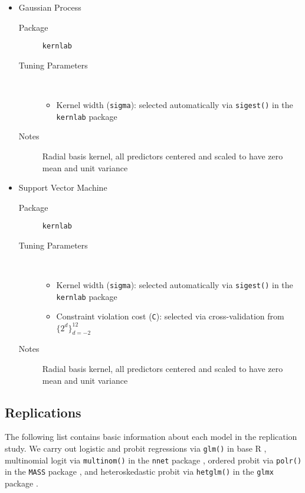 \begin{itemize}
  \item Gaussian Process
  \begin{description}
    \item[Package] \texttt{kernlab} \citep{pkg-kernlab}
    \item[Tuning Parameters] ~
    \begin{itemize}
      \item Kernel width (\texttt{sigma}): selected automatically via \texttt{sigest()} in the \texttt{kernlab} package
    \end{itemize}
    \item[Notes] Radial basis kernel, all predictors centered and scaled to have zero mean and unit variance
  \end{description}

  \item Support Vector Machine
  \begin{description}
    \item[Package] \texttt{kernlab} \citep{pkg-kernlab}
    \item[Tuning Parameters] ~
    \begin{itemize}
      \item Kernel width (\texttt{sigma}): selected automatically via \texttt{sigest()} in the \texttt{kernlab} package
      \item Constraint violation cost (\texttt{C}): selected via cross-validation from $\{2^d\}_{d=-2}^{12}$
    \end{itemize}
    \item[Notes] Radial basis kernel, all predictors centered and scaled to have zero mean and unit variance
  \end{description}
\end{itemize}

\subsection{Replications}

The following list contains basic information about each model in the replication study.
We carry out logistic and probit regressions via \texttt{glm()} in base R \citep{pkg-R}, multinomial logit via \texttt{multinom()} in the \texttt{nnet} package \citep{pkg-MASS}, ordered probit via \texttt{polr()} in the \texttt{MASS} package \citep{pkg-MASS}, and heteroskedastic probit via \texttt{hetglm()} in the \texttt{glmx} package \citep{pkg-glmx}.



